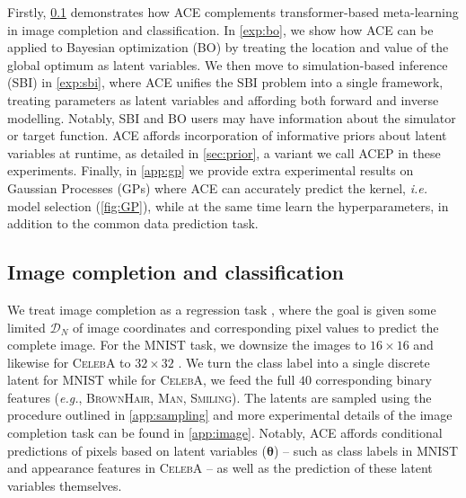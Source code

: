 \documentclass[twoside]{article}
\makeatletter
\newcommand{\vtheta}{{\bm{\theta}}}
\newcommand{\data}{\mathcal{D}}
\newcommand{\ie}{\textit{i.e.}\@\xspace}
\newcommand{\eg}{\textit{e.g.}\@\xspace}
\makeatother
\begin{document}
Firstly, \cref{exp:image} demonstrates how ACE complements transformer-based meta-learning in image completion and classification. In \cref{exp:bo}, we show how ACE can be applied to Bayesian optimization (BO) by treating the location and value of the global optimum as latent variables. We then move to simulation-based inference (SBI) in \cref{exp:sbi}, where ACE unifies the SBI problem into a single framework, treating parameters as latent variables and affording both forward and inverse modelling. Notably, SBI and BO users may have information about the simulator or target function. ACE affords incorporation of informative priors about latent variables at runtime, as detailed in \cref{sec:prior}, a variant we call ACEP in these experiments. Finally, 
in \cref{app:gp} we provide extra experimental results on Gaussian Processes (GPs) where ACE can accurately predict the kernel, \ie model selection (\cref{fig:GP}), while at the same time learn the hyperparameters, in addition to the common data prediction task.

\vspace{-0.25em}
\subsection{Image completion and classification}
\label{exp:image}

\vspace{-0.25em}
We treat image completion as a regression task \citep{garnelo2018neural}, where the goal is given some limited $\data_N$ of image coordinates and corresponding pixel values to predict the complete image. For the \textsc{MNIST} \citep{deng2012mnist} task, we downsize the images to $16 \times 16$ and likewise for \textsc{CelebA} to $32 \times 32$ \citep{liu2015faceattributes}. We turn the class label into a single discrete latent for \textsc{MNIST} while for \textsc{CelebA}, we feed the full $40$ corresponding binary features (\eg, \textsc{BrownHair, Man, Smiling}). The latents are sampled using the procedure outlined in \cref{app:sampling} and more experimental details of the image completion task can be found in \cref{app:image}. Notably, ACE affords conditional predictions of pixels based on latent variables ($\vtheta$) -- such as class labels in \textsc{MNIST} and appearance features in \textsc{CelebA} -- as well as the prediction of these latent variables themselves.
\end{document}
